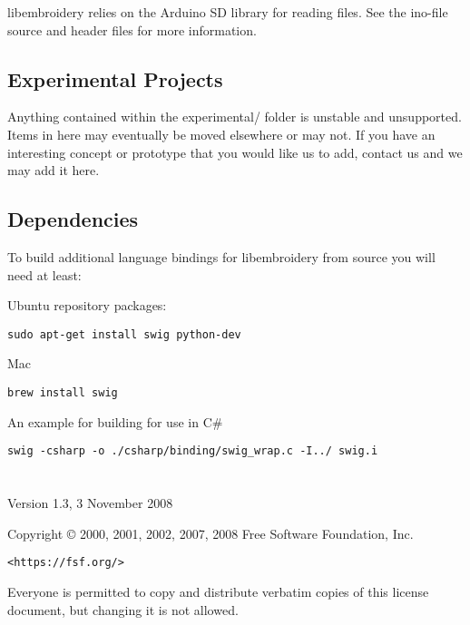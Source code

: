 \documentclass[onesize, a4paper]{refart}
\begin{document}
libembroidery relies on the Arduino SD library for reading files. See
the ino-file source and header files for more information.

\subsection{Experimental Projects}

Anything contained within the experimental/ folder is unstable and
unsupported. Items in here may eventually be moved elsewhere or may not.
If you have an interesting concept or prototype that you would like us
to add, contact us and we may add it here.

\subsection{Dependencies}

To build additional language bindings for libembroidery from source you
will need at least:

Ubuntu repository packages:

\begin{verbatim}
sudo apt-get install swig python-dev
\end{verbatim}

Mac

\begin{verbatim}
brew install swig
\end{verbatim}

An example for building for use in C\#

\begin{verbatim}
swig -csharp -o ./csharp/binding/swig_wrap.c -I../ swig.i
\end{verbatim}

\newpage




\newpage

\section{}

 \begin{center}

       Version 1.3, 3 November 2008


 Copyright \copyright{} 2000, 2001, 2002, 2007, 2008  Free Software Foundation, Inc.
 
 \bigskip
 
     \texttt{<https://fsf.org/>}
  
 \bigskip
 
 Everyone is permitted to copy and distribute verbatim copies
 of this license document, but changing it is not allowed.
\end{center}
\end{document}
